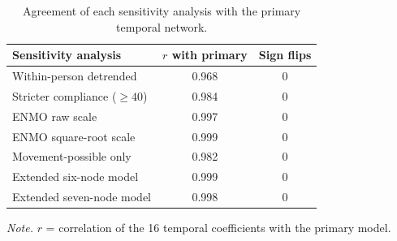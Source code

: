 \begin{table}[H]
\raggedright
\caption{Agreement of each sensitivity analysis with the primary temporal network.}
\label{tab:agreement}
\footnotesize
\begingroup
\setlength{\tabcolsep}{4pt}
\renewcommand{\arraystretch}{1.08}
\noindent
\begin{tabular*}{\textwidth}{@{\extracolsep{\fill}}lcc@{}}
\toprule
Sensitivity analysis & $r$ with primary & Sign flips \\
\midrule
Within-person detrended & 0.968 & 0 \\
Stricter compliance ($\geq 40$) & 0.984 & 0 \\
ENMO raw scale & 0.997 & 0 \\
ENMO square-root scale & 0.999 & 0 \\
Movement-possible only & 0.982 & 0 \\
Extended six-node model & 0.999 & 0 \\
Extended seven-node model & 0.998 & 0 \\
\bottomrule
\end{tabular*}
\par\vspace{3pt}\noindent\parbox{\textwidth}{\footnotesize\textit{Note.} $r$ = correlation of the 16 temporal coefficients with the primary model.}
\endgroup
\end{table}
